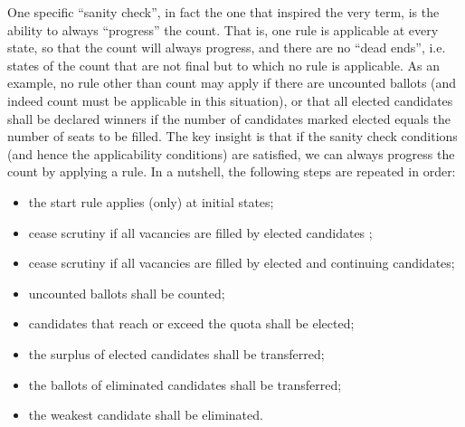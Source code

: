\documentclass{llncs}
\begin{document}
One specific ``sanity check'', in fact the one that 
inspired the very term, is the ability to always 
``progress'' the count. That is, one rule is
applicable at every state, so that the count will always progress,
and there are no ``dead ends'', i.e. states of the count that are
not final but to which no rule is applicable. 
As an example, no rule other than count may apply if
there are uncounted ballots (and indeed count must be applicable in
this situation), or that all elected candidates shall be
declared winners if the number of candidates marked elected equals
the number of seats to be filled.  
The key insight is
that if the sanity check conditions (and hence the applicability
conditions) are satisfied, we can always
progress the count by applying a rule. In a nutshell, the following
steps are repeated in order:
\begin{itemize}
  \item the start rule applies (only) at initial states;
  \item cease scrutiny if all vacancies are filled by elected candidates ;
  \item cease scrutiny if all vacancies are filled by elected and continuing candidates;
  \item uncounted ballots shall be counted;
  \item candidates that reach or exceed the quota shall be elected;
  \item the surplus of elected candidates shall be transferred;
  \item the ballots of eliminated candidates shall be transferred;
  \item the weakest candidate shall be eliminated.
\end{itemize}
\end{document}
